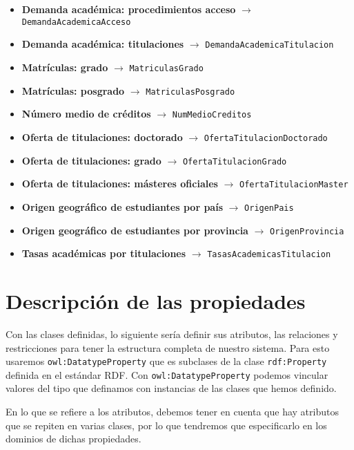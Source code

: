 \begin{itemize}
	\item \textbf{Demanda académica: procedimientos acceso} $\rightarrow$ {\tt DemandaAcademicaAcceso}
	\item \textbf{Demanda académica: titulaciones} $\rightarrow$ {\tt DemandaAcademicaTitulacion}
	\item \textbf{Matrículas: grado} $\rightarrow$ {\tt MatriculasGrado}
	\item \textbf{Matrículas: posgrado} $\rightarrow$ {\tt MatriculasPosgrado}
	\item \textbf{Número medio de créditos} $\rightarrow$ {\tt NumMedioCreditos}
	\item \textbf{Oferta de titulaciones: doctorado} $\rightarrow$ {\tt OfertaTitulacionDoctorado}
	\item \textbf{Oferta de titulaciones: grado} $\rightarrow$ {\tt OfertaTitulacionGrado}
	\item \textbf{Oferta de titulaciones: másteres oficiales} $\rightarrow$ {\tt OfertaTitulacionMaster}
	\item \textbf{Origen geográfico de estudiantes por país} $\rightarrow$ {\tt OrigenPais}
	\item \textbf{Origen geográfico de estudiantes por provincia} $\rightarrow$ {\tt OrigenProvincia}
	\item \textbf{Tasas académicas por titulaciones} $\rightarrow$ {\tt TasasAcademicasTitulacion}
\end{itemize}

\section{Descripción de las propiedades}

Con las clases definidas, lo siguiente sería definir sus atributos, las relaciones y restricciones para tener la estructura completa de nuestro sistema. Para esto usaremos {\tt owl:DatatypeProperty} que es subclases de la clase {\tt rdf:Property} definida en el estándar {\sf RDF}. Con {\tt owl:DatatypeProperty} podemos vincular valores del tipo que definamos con instancias de las clases que hemos definido.

\bigskip
En lo que se refiere a los atributos, debemos tener en cuenta que hay atributos que se repiten en varias clases, por lo que tendremos que especificarlo en los dominios de dichas propiedades.

